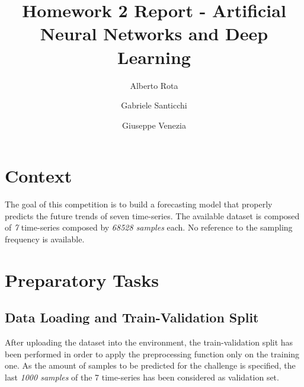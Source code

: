 \documentclass[conference]{IEEEtran}
\begin{document}
\title{Homework 2 Report - Artificial Neural Networks and Deep Learning}

\author{
Alberto Rota
\and
Gabriele Santicchi 
\and
Giuseppe Venezia 
}

\maketitle
\section{Context}
    The goal of this competition is to build a forecasting model that properly 
    predicts the future trends of seven time-series. The available dataset is
    composed of \textit{7} time-series composed by \textit{68528 samples} each. No reference to the sampling frequency is available. 
\section{Preparatory Tasks}
\subsection{Data Loading and Train-Validation Split}
    After uploading the dataset into the environment, the train-validation split has been performed in order to apply the preprocessing function only 
    on the training one. As the amount of samples to be predicted for the challenge is specified, the last \textit{1000 samples} of the 7 time-series 
    has been considered as validation set. 
\end{document}
